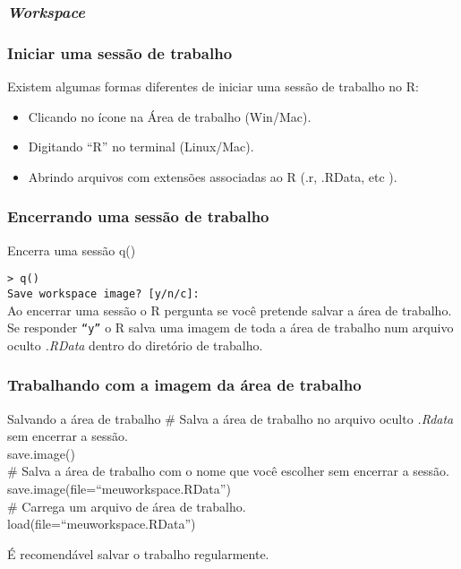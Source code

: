 \documentclass{beamer}
\begin{document}
\begin{frame}
  \frametitle{\textit{Workspace}}
  \begin{center}
  \end{center}
\end{frame}
\begin{frame}
  \frametitle{Iniciar uma sessão de trabalho}
  Existem algumas formas diferentes de iniciar uma sessão de trabalho no R:
  \begin{itemize}
    \item Clicando no ícone na Área de trabalho (Win/Mac).
    \item Digitando ``R'' no terminal (Linux/Mac).
    \item Abrindo arquivos com extensões associadas ao R (.r, .RData, etc
).
  \end{itemize}
  \begin{center}
  \end{center}
\end{frame}
 
\begin{frame}
  \frametitle{Encerrando uma sessão de trabalho}
  \begin{block}{Encerra uma sessão}
    q()
  \end{block}
\texttt{> q()\\
Save workspace image? [y/n/c]:}
\vspace{10pt}\\
Ao encerrar uma sessão o R pergunta se você pretende salvar a área de trabalho. Se responder \texttt{``y''} o R salva uma imagem de toda a área de trabalho num arquivo oculto \textit{.RData} dentro do diretório de trabalho.
\end{frame}
\begin{frame}
  \frametitle{Trabalhando com a imagem da área de trabalho}
  \begin{block}{Salvando a área de trabalho}
    \# Salva a área de trabalho no arquivo oculto \textit{.Rdata} sem encerrar a sessão. \\
     save.image()\\
    \vspace{10pt}
    \#  Salva a área de trabalho com o nome que você escolher  sem encerrar a sessão.\\
     save.image(file=``meuworkspace.RData'')\\
 \vspace{10pt}
   \# Carrega um arquivo de área de trabalho. \\
    load(file=``meuworkspace.RData'')
  \end{block}
 É recomendável salvar o trabalho  regularmente.  
\end{frame}
\end{document}
